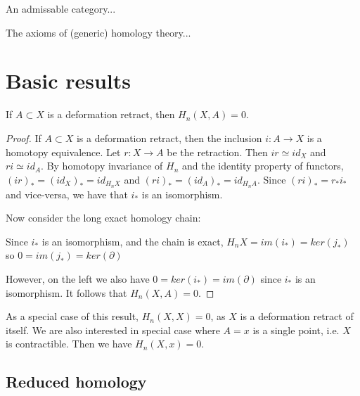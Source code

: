 An admissable category...

The axioms of (generic) homology theory...

\section{Basic results}
\begin{prop}
If $A\subset X$ is a deformation retract, then $H_n(X,A)=0$.
\end{prop}
\begin{proof}
If $A\subset X$ is a deformation retract, then the inclusion $i:A\rightarrow X$ is a homotopy equivalence. Let $r:X\rightarrow A$ be the retraction. Then $ir\simeq id_X$ and $ri\simeq id_A$.
By homotopy invariance of $H_n$ and the identity property of functors, $(ir)_*=(id_{X})_*=id_{H_nX}$ and $(ri)_*=(id_{A})_*=id_{H_nA}$. Since $(ri)_*=r_*i_*$ and vice-versa, we have that $i_*$ is an isomorphism.

Now consider the long exact homology chain:



Since $i_*$ is an isomorphism, and the chain is exact, $H_nX=im(i_*)=ker(j_*)$ so $0=im(j_*)=ker(\partial)$

However, on the left we also have $0=ker(i_*)=im(\partial)$ since $i_*$ is an isomorphism. It follows that $H_n(X,A)=0$.

\end{proof}

\begin{remark}
\label{contractible-0}
As a special case of this result, $H_n(X,X)=0$, as $X$ is a deformation retract of itself. We are also interested in special case where $A=x$ is a single point, i.e. $X$ is contractible. Then we have $H_n(X,x)=0$.
\end{remark}

\subsection{Reduced homology}

